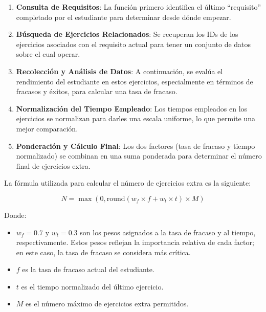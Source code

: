 \begin{enumerate}
    \item \textbf{Consulta de Requisitos}: La función primero identifica el último ``requisito'' completado por el estudiante para determinar desde dónde empezar.
    \item \textbf{Búsqueda de Ejercicios Relacionados}: Se recuperan los IDs de los ejercicios asociados con el requisito actual para tener un conjunto de datos sobre el cual operar.
    \item \textbf{Recolección y Análisis de Datos}: A continuación, se evalúa el rendimiento del estudiante en estos ejercicios, especialmente en términos de fracasos y éxitos, para calcular una tasa de fracaso.
    \item \textbf{Normalización del Tiempo Empleado}: Los tiempos empleados en los ejercicios se normalizan para darles una escala uniforme, lo que permite una mejor comparación.
    \item \textbf{Ponderación y Cálculo Final}: Los dos factores (tasa de fracaso y tiempo normalizado) se combinan en una suma ponderada para determinar el número final de ejercicios extra.
\end{enumerate}

La fórmula utilizada para calcular el número de ejercicios extra es la siguiente:

\begin{equation}
N = \max\left(0, \text{round}\left( w_f \times f + w_t \times t \right) \times M \right)
\end{equation}

Donde:

\begin{itemize}
    \item \( w_f = 0.7 \) y \( w_t = 0.3 \) son los pesos asignados a la tasa de fracaso y al tiempo, respectivamente. Estos pesos reflejan la importancia relativa de cada factor; en este caso, la tasa de fracaso se considera más crítica.
    \item \( f \) es la tasa de fracaso actual del estudiante.
    \item \( t \) es el tiempo normalizado del último ejercicio.
    \item \( M \) es el número máximo de ejercicios extra permitidos.
\end{itemize}

